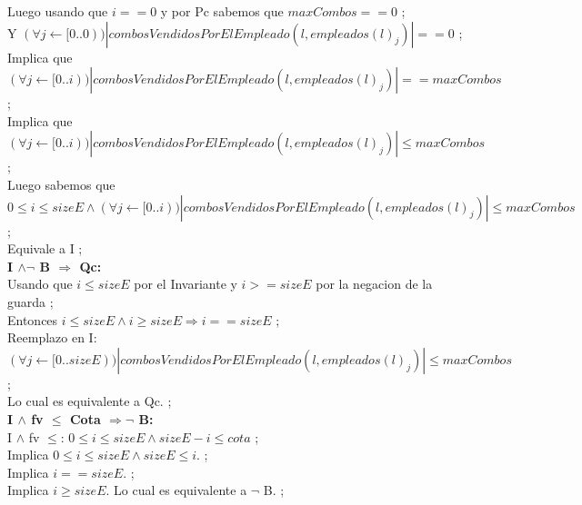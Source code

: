 Luego usando que $i == 0$ y por Pc sabemos que $maxCombos == 0$ ;\\
Y $(\forall j \leftarrow [0..0)) |combosVendidosPorElEmpleado(l, empleados(l)_j)| == 0 $ ;\\
Implica que $(\forall j \leftarrow [0..i)) |combosVendidosPorElEmpleado(l, empleados(l)_j)| == maxCombos $ ;\\
Implica que $(\forall j \leftarrow [0..i)) |combosVendidosPorElEmpleado(l, empleados(l)_j)| \leq maxCombos $ ;\\

Luego sabemos que $0 \leq i \leq sizeE \wedge (\forall j \leftarrow [0..i)) |combosVendidosPorElEmpleado(l, empleados(l)_j)| \leq maxCombos$ ;\\
Equivale a I ;\\

\hspace{15pt}\textbf{I $\wedge \neg $ B $\Rightarrow$ Qc:} \\
Usando que $i \leq sizeE$ por el Invariante y $i >= sizeE$ por la negacion de la guarda ;\\
Entonces $i \leq sizeE \wedge  i \geq sizeE \Rightarrow i == sizeE $ ;\\
Reemplazo en I: $(\forall j \leftarrow [0..sizeE)) |combosVendidosPorElEmpleado(l, empleados(l)_j)| \leq maxCombos $ ;\\
Lo cual es equivalente a Qc. ;\\

\hspace{15pt}\textbf{I $\wedge$ fv $\leq$ Cota $\Rightarrow \neg$ B:} \\
I $\wedge$ fv $\leq$: $0 \leq i \leq sizeE \wedge sizeE - i \leq cota$ ;\\
Implica $ 0 \leq i \leq sizeE \wedge sizeE \leq i.$ ;\\
Implica $i == sizeE.$ ;\\
Implica $i \geq sizeE.$ Lo cual es equivalente a $ \neg$ B. ;\\
\\
\\

